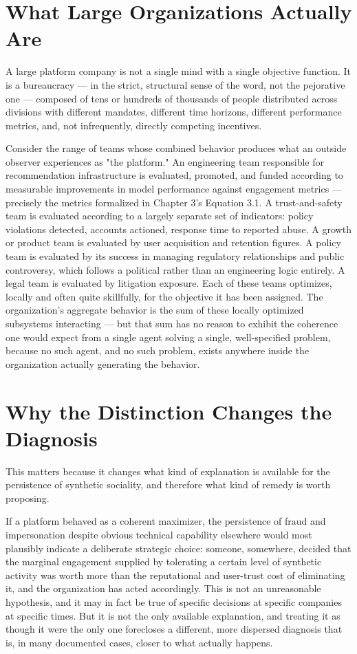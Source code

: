\documentclass[12pt,a4paper]{book}
\begin{document}
\section{What Large Organizations Actually Are}

A large platform company is not a single mind with a single objective function. It is a bureaucracy — in the strict, structural sense of the word, not the pejorative one — composed of tens or hundreds of thousands of people distributed across divisions with different mandates, different time horizons, different performance metrics, and, not infrequently, directly competing incentives.

Consider the range of teams whose combined behavior produces what an outside observer experiences as "the platform." An engineering team responsible for recommendation infrastructure is evaluated, promoted, and funded according to measurable improvements in model performance against engagement metrics — precisely the metrics formalized in Chapter 3's Equation 3.1. A trust-and-safety team is evaluated according to a largely separate set of indicators: policy violations detected, accounts actioned, response time to reported abuse. A growth or product team is evaluated by user acquisition and retention figures. A policy team is evaluated by its success in managing regulatory relationships and public controversy, which follows a political rather than an engineering logic entirely. A legal team is evaluated by litigation exposure. Each of these teams optimizes, locally and often quite skillfully, for the objective it has been assigned. The organization's aggregate behavior is the sum of these locally optimized subsystems interacting — but that sum has no reason to exhibit the coherence one would expect from a single agent solving a single, well-specified problem, because no such agent, and no such problem, exists anywhere inside the organization actually generating the behavior.

\section{Why the Distinction Changes the Diagnosis}

This matters because it changes what kind of explanation is available for the persistence of synthetic sociality, and therefore what kind of remedy is worth proposing.

If a platform behaved as a coherent maximizer, the persistence of fraud and impersonation despite obvious technical capability elsewhere would most plausibly indicate a deliberate strategic choice: someone, somewhere, decided that the marginal engagement supplied by tolerating a certain level of synthetic activity was worth more than the reputational and user-trust cost of eliminating it, and the organization has acted accordingly. This is not an unreasonable hypothesis, and it may in fact be true of specific decisions at specific companies at specific times. But it is not the only available explanation, and treating it as though it were the only one forecloses a different, more dispersed diagnosis that is, in many documented cases, closer to what actually happens.
\end{document}
